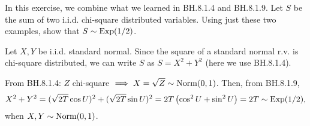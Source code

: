 \documentclass[assignments]{subfiles}
\begin{document}
\begin{exercise}
In this exercise, we combine what we learned in BH.8.1.4 and  BH.8.1.9.  Let $S$ be the sum of two i.i.d. chi-square distributed variables. Using just these two examples, show that $S \sim \mathrm{Exp}(1/2)$.

\begin{hint}
Let $X, Y$ be i.i.d. standard normal. Since the square of a standard normal r.v. is chi-square distributed, we can write $S$ as $S=X^2+Y^2$ (here we use  BH.8.1.4).
\end{hint}
\begin{solution}
  From BH.8.1.4: $Z$ chi-square $\implies X=\sqrt{Z} \sim \mathrm{Norm}(0,1)$.
  Then, from BH.8.1.9,
\begin{equation}
X^{2}+Y^2 = (\sqrt{2T} \cos U)^2 + (\sqrt{2T} \sin U)^2 = 2T \left(\cos^2 U+\sin^2 U\right) = 2T \sim \mathrm{Exp}(1/2),
\end{equation}
 when $X, Y\sim \mathrm{Norm}(0,1)$.
\end{solution}
\end{exercise}
\end{document}
